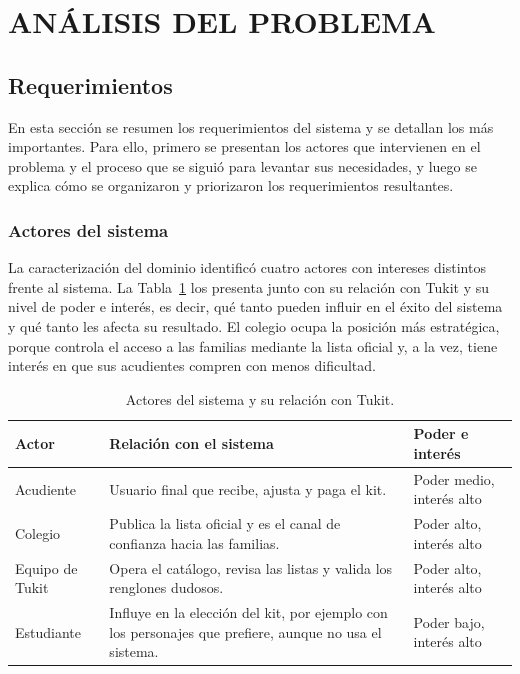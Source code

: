\setcounter{subsection}{0}
\section{ANÁLISIS DEL PROBLEMA}

\subsection{Requerimientos}

En esta sección se resumen los requerimientos del sistema y se detallan los más importantes.
Para ello, primero se presentan los actores que intervienen en el problema y el proceso que
se siguió para levantar sus necesidades, y luego se explica cómo se organizaron y
priorizaron los requerimientos resultantes.\par

\subsubsection{Actores del sistema}

La caracterización del dominio identificó cuatro actores con intereses distintos frente al
sistema. La Tabla~\ref{tab:actores} los presenta junto con su relación con Tukit y su nivel
de poder e interés, es decir, qué tanto pueden influir en el éxito del sistema y qué tanto
les afecta su resultado. El colegio ocupa la posición más estratégica, porque controla el
acceso a las familias mediante la lista oficial y, a la vez, tiene interés en que sus
acudientes compren con menos dificultad.\par

\begin{table}[H]
\centering\footnotesize
\setlength{\tabcolsep}{4pt}
\renewcommand{\arraystretch}{1.25}
\caption{Actores del sistema y su relación con Tukit.}
\label{tab:actores}
\begin{tabularx}{\textwidth}{@{}p{2.6cm}Xp{3.2cm}@{}}
\toprule
\textbf{Actor} & \textbf{Relación con el sistema} & \textbf{Poder e interés} \\
\midrule
Acudiente & Usuario final que recibe, ajusta y paga el kit. & Poder medio, interés alto \\
Colegio & Publica la lista oficial y es el canal de confianza hacia las familias. & Poder
alto, interés alto \\
Equipo de Tukit & Opera el catálogo, revisa las listas y valida los renglones dudosos. &
Poder alto, interés alto \\
Estudiante & Influye en la elección del kit, por ejemplo con los personajes que prefiere,
aunque no usa el sistema. & Poder bajo, interés alto \\
\bottomrule
\end{tabularx}
\end{table}

